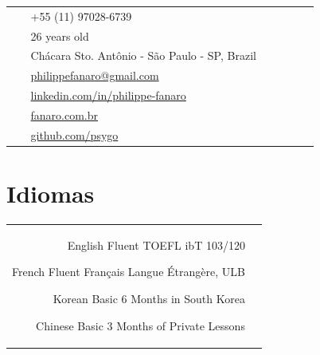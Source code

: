 \documentclass[10pt]{article} %
\begin{document}
\begin{paracol}{2}
{{\begin{supertabular}{p{0.05\linewidth}|p{0.775\linewidth}}
        	\raisebox{-1pt}{\faPhone} & +55 (11) 97028-6739 \\
        	
        	\raisebox{-1pt}{\faMale} & 26 years old \\
        	
			\raisebox{-1pt}{\faHome} & Chácara Sto. Antônio - São Paulo - SP, Brazil \\
			
			\raisebox{0pt}{\small\faEnvelope} & \href{mailto:philippefanaro@gmail.com}{philippefanaro@gmail.com} \\
			
            \raisebox{-1pt}{\small\faLinkedinSquare} & \href{https://www.linkedin.com/in/philippe-fanaro/}{linkedin.com/in/philippe-fanaro} \\
            
			\raisebox{-1pt}{\small\faLaptop} & \href{http://fanaro.com.br/}{fanaro.com.br} \\
			
			\raisebox{-1pt}{\small\faGithub} & \href{https://github.com/psygo}{github.com/psygo} \\
			
		\end{supertabular}
	}
}

\section{Idiomas} 

\begin{supertabular}{rl}

	
	{English}
	{Fluent}
	{TOEFL ibT 103/120}
	{}
	
	
	{French}
	{Fluent}
	{Français Langue Étrangère, ULB}
	{}
	
	
	{Korean}
	{Basic}
	{6 Months in South Korea}
	{}
	
	
	{Chinese}
	{Basic}
	{3 Months of Private Lessons}
	{}
	

\end{supertabular}


\end{paracol}
\end{document}
